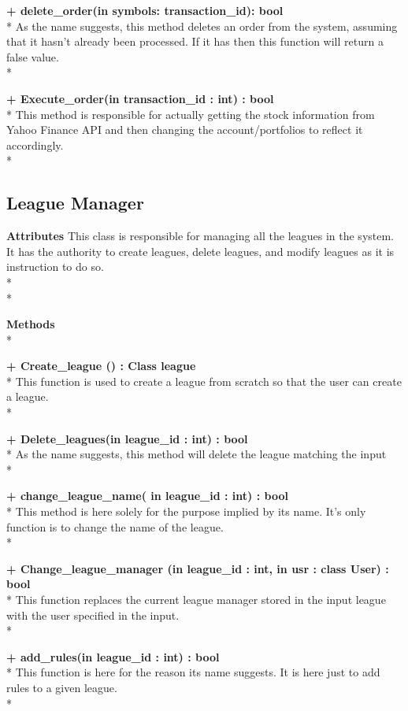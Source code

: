 {\bfseries + delete_order(in symbols: transaction_id): bool } \\*
	As the name suggests, this method deletes an order from
    the system, assuming that it hasn’t already been processed.
    If it has then this function will return a false value. \\*

{\bfseries + Execute_order(in transaction_id : int) : bool } \\*
	This method is responsible for actually getting the stock
    information from Yahoo Finance API and then changing the
    account/portfolios to reflect it accordingly. \\*

\subsection{League Manager}

{\bfseries Attributes}
This class is responsible for managing all the leagues in the
system.  It has the authority to create leagues, delete leagues,
and modify leagues as it is instruction to do so.  \\* \\*

{\bfseries Methods} \\*

{\bfseries + Create_league () : Class league } \\*
	This function is used to create a league from scratch so
    that the user can create a league. \\*

{\bfseries + Delete_leagues(in league_id : int) : bool } \\*
	As the name suggests, this method will delete the league
    matching the input\\*

{\bfseries + change_league_name( in league_id : int) : bool } \\*
	This method is here solely for the purpose implied by its
    name.  It’s only function is to change the name of the
    league.  \\*

{\bfseries + Change_league_manager (in league_id : int, in usr : class User) : bool } \\*
	This function replaces the current league manager stored
    in the input league with the user specified in the input. \\*

{\bfseries + add_rules(in league_id : int) : bool } \\*
	This function is here for the reason its name suggests.
    It is here just to add rules to a given league.  \\*

